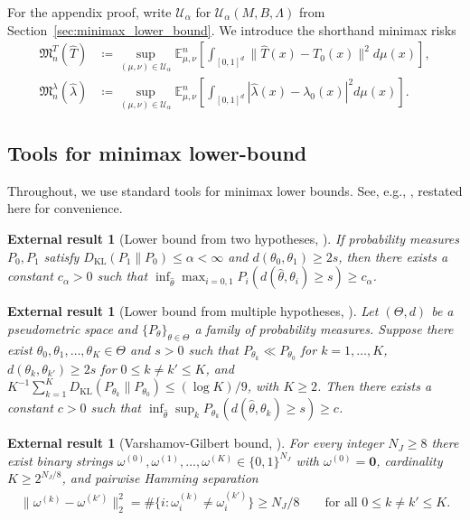 \documentclass[11pt,reqno]{amsart}
\newtheorem{external}[theorem]{External result}
\theoremstyle{definition}
\newcommand{\KL}{\mathrm{KL}}
\renewcommand{\hat}{\widehat}
\begin{document}
For the appendix proof, write $\mathcal U_\alpha$ for $\mathcal U_\alpha(M,B,\Lambda)$ from Section~\ref{sec:minimax_lower_bound}. We introduce the shorthand minimax risks
\begin{align}
    \mathfrak M_n^T(\hat T)
    &\coloneqq
    \sup_{(\mu,\nu)\in\mathcal U_\alpha}
    \mathbb E_{\mu,\nu}^n\left[
        \int_{[0,1]^d}\|\hat T(x)-T_0(x)\|^2 d\mu(x)
    \right],\\
    \mathfrak M_n^\lambda(\hat\lambda)
    &\coloneqq
    \sup_{(\mu,\nu)\in\mathcal U_\alpha}
    \mathbb E_{\mu,\nu}^n\left[
        \int_{[0,1]^d}|\hat\lambda(x)-\lambda_0(x)|^2 d\mu(x)
    \right].
\end{align}

\subsection{Tools for minimax lower-bound}

Throughout, we use standard tools for minimax lower bounds. See, e.g., \cite[Theorem~2.2 and~2.5]{tsybakov2009nonparametric}, restated here for convenience.

\begin{external}[Lower bound from two hypotheses, \cite{tsybakov2009nonparametric}]\label{thm:tsy-twopoint}
    If probability measures $P_0,P_1$ satisfy $D_\KL(P_1\|P_0)\le \alpha<\infty$ and $d(\theta_0,\theta_1)\ge 2s$, then there exists a constant $c_\alpha>0$ such that $\inf_{\hat\theta}\max_{i=0,1}P_i(d(\hat\theta,\theta_i)\ge s)\ge c_\alpha$.
\end{external}
\begin{external}[Lower bound from multiple hypotheses, \cite{tsybakov2009nonparametric}]\label{thm:tsy-fano}
    Let $(\Theta,d)$ be a pseudometric space and $\{P_\theta\}_{\theta\in\Theta}$ a family of probability measures. Suppose there exist $\theta_0,\theta_1,\dots,\theta_K\in\Theta$ and $s>0$ such that $P_{\theta_k} \ll P_{\theta_0}$ for $k=1,\ldots,K$, $d(\theta_k,\theta_{k'})\ge 2s$ for $0\le k\ne k'\le K$, and $K^{-1}\sum_{k=1}^KD_\KL(P_{\theta_k}\|P_{\theta_0})\le (\log K)/9$, with $K\ge2$. Then there exists a constant $c>0$ such that $\inf_{\hat\theta}\sup_k P_{\theta_k}(d(\hat\theta,\theta_k)\ge s)\ge c$.
\end{external}
\begin{external}[Varshamov-Gilbert bound, {\cite[Lemma~2.9]{tsybakov2009nonparametric}}]\label{lem:vg}
    For every integer $N_J\ge 8$ there exist binary strings $\omega^{(0)},\omega^{(1)},\dots,\omega^{(K)}\in\{0,1\}^{N_J}$ with $\omega^{(0)}=\mathbf 0$, cardinality $K\ge 2^{N_J/8}$, and pairwise Hamming separation
    \begin{align}
        \|\omega^{(k)}-\omega^{(k')}\|_2^2 = \#\{i:\omega^{(k)}_i\ne\omega^{(k')}_i\} \ge N_J/8 \qquad \text{for all }0\le k\ne k'\le K.
    \end{align}
\end{external}
\end{document}
